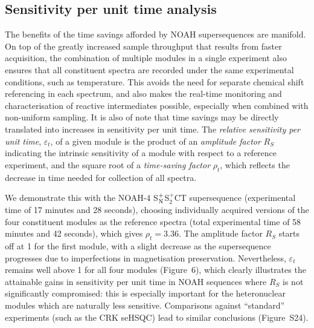 \documentclass[final,twocolumn]{elsarticle}
\newcommand*{\noahC}{C}
\newcommand*{\noahSpb}{S$^+_2$}
\newcommand*{\noahSpn}{S$\rm ^+_N$}
\newcommand*{\noahT}{T}
\begin{document}
\subsection{Sensitivity per unit time analysis}
The benefits of the time savings afforded by NOAH supersequences are manifold.
On top of the greatly increased sample throughput that results from faster acquisition, the combination of multiple modules in a single experiment also ensures that all constituent spectra are recorded under the same experimental conditions, such as temperature.
This avoids the need for separate chemical shift referencing in each spectrum, and also makes the real-time monitoring and characterisation of reactive intermediates possible, especially when combined with non-uniform sampling.
It is also of note that time savings may be directly translated into increases in sensitivity per unit time.
The \textit{relative sensitivity per unit time}, $\varepsilon_t$, of a given module is the product of an \textit{amplitude factor} $R_S$ indicating the intrinsic sensitivity of a module with respect to a reference experiment, and the square root of a \textit{time-saving factor} $\rho_t$, which reflects the decrease in time needed for collection of all spectra.\cite{Kupce2019JMR}

We demonstrate this with the NOAH-4 \noahSpn{}\noahSpb{}\noahC{}\noahT{} supersequence (experimental time of 17 minutes and 28 seconds), choosing individually acquired versions of the four constituent modules as the reference spectra (total experimental time of 58 minutes and 42 seconds), which gives $\rho_t = 3.36$.
The amplitude factor $R_S$ starts off at 1 for the first module, with a slight decrease as the supersequence progresses due to imperfections in magnetisation preservation.
Nevertheless, $\varepsilon_t$ remains well above 1 for all four modules (Figure~6), which clearly illustrates the attainable gains in sensitivity per unit time in NOAH sequences where $R_S$ is not significantly compromised: this is especially important for the heteronuclear modules which are naturally less sensitive.
Comparisons against ``standard'' experiments (such as the CRK seHSQC) lead to similar conclusions (Figure~S24).
\end{document}
